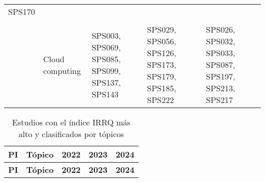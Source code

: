 \begin{longtable}{c Z Y Y Y}
SPS170 \\\\ & Cloud computing & SPS003, SPS069, SPS085, SPS099, SPS137, SPS143 & SPS029, SPS056, SPS126, SPS173, SPS179, SPS185, SPS222 & SPS026, SPS032, SPS033,  SPS087, SPS197,  SPS213, SPS217 \\ \bottomrule
\end{longtable}

\twocolumn

\onecolumn

\begin{longtable}{c Z Y Y Y}
\caption{Estudios con el índice IRRQ más alto y clasificados por tópicos}\label{tab:higher-irrq} \\

\toprule
\textbf{PI} & \textbf{Tópico} & \textbf{2022} & \textbf{2023} & \textbf{2024} \\
\midrule
\endfirsthead

\toprule
\textbf{PI} & \textbf{Tópico} & \textbf{2022} & \textbf{2023} & \textbf{2024} \\
\midrule
\endhead


\end{longtable}
